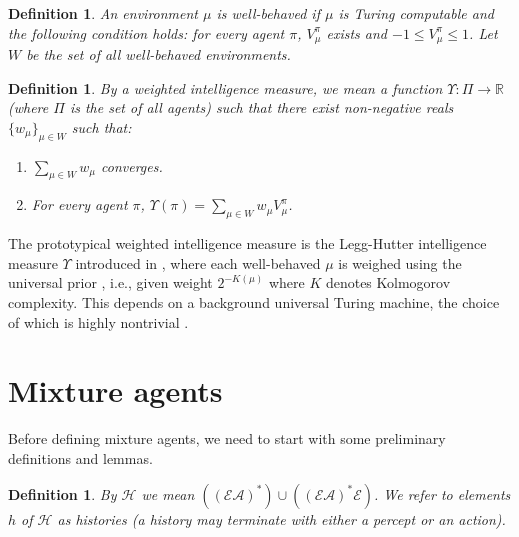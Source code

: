 \documentclass[twoside]{article}
\newtheorem{definition}[theorem]{Definition}
\begin{document}
\begin{definition}
    An environment $\mu$ is \emph{well-behaved} if $\mu$ is Turing
    computable and the following
    condition holds: for every agent $\pi$, $V^\pi_\mu$ exists and
    $-1\leq V^\pi_\mu\leq 1$. Let $W$ be the set of all well-behaved environments.
\end{definition}

\begin{definition}
\label{performanceaveragerdefn}
    By a \emph{weighted intelligence measure}, we mean a function
    $\Upsilon:\Pi\to \mathbb R$ (where $\Pi$ is the set of all agents)
    such that there exist non-negative reals $\{w_\mu\}_{\mu\in W}$ such that:
    \begin{enumerate}
        \item
        $\sum_{\mu\in W}w_\mu$ converges.
        \item
        For every agent $\pi$, $\Upsilon(\pi)=\sum_{\mu\in W}w_\mu V^\pi_\mu$.
    \end{enumerate}
\end{definition}

The prototypical weighted intelligence measure is the Legg-Hutter intelligence
measure $\Upsilon$ introduced in \cite{legg2007universal},
where each well-behaved $\mu$ is
weighed using the universal prior \cite{li2008introduction}, i.e.,
given weight $2^{-K(\mu)}$
where $K$ denotes Kolmogorov complexity. This depends on a background universal
Turing machine, the choice of which is highly nontrivial
\cite{leike2015bad}.

\section{Mixture agents}

Before defining mixture agents, we need to start with some preliminary definitions
and lemmas.

\begin{definition}
    By $\mathcal H$ we mean
    $((\mathcal E\mathcal A)^*)\cup((\mathcal E\mathcal A)^*\mathcal E)$.
    We refer to elements $h$ of $\mathcal H$ as \emph{histories} (a history
    may terminate with either a percept or an action).
\end{definition}
\end{document}
